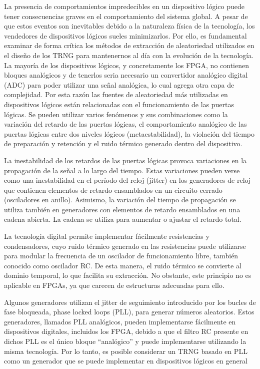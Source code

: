                 La presencia de comportamientos impredecibles en un dispositivo lógico puede tener consecuencias graves en el comportamiento del sistema global. A pesar de que estos eventos son inevitables debido a la naturaleza física de la tecnología, los vendedores de dispositivos lógicos sueles minimizarlos. Por ello, es fundamental examinar de forma crítica los métodos de extracción de aleatoriedad utilizados en el diseño de los TRNG para mantenernos al día con la evolución de la tecnología.
                La mayoría de los dispositivos lógicos, y concretamente los FPGA, no contienen bloques analógicos y de tenerlos seria necesario un convertidor analógico digital (ADC) para poder utilizar una señal analógica, lo cual agrega otra capa de complejidad. Por esta razón las fuentes de aleatoriedad más utilizadas en dispositivos lógicos están relacionadas con el funcionamiento de las puertas lógicas. Se pueden utilizar varios fenómenos y sus combinaciones como la variación del retardo de las puertas lógicas, el comportamiento analógico de las puertas lógicas entre dos niveles lógicos (metaestabilidad), la violación del tiempo de preparación y retención y el ruido térmico generado dentro del dispositivo.	
					
	            La inestabilidad de los retardos de las puertas lógicas provoca variaciones en la propagación de la señal a lo largo del tiempo. Estas variaciones pueden verse como una inestabilidad  en el período del reloj (jitter) en los generadores de reloj que contienen elementos de retardo ensamblados en un circuito cerrado (osciladores en anillo). Asimismo, la variación del tiempo de propagación se utiliza también en generadores con elementos de retardo ensamblados en una cadena abierta. La cadena se utiliza para aumentar o ajustar el retardo total.

                La tecnología digital permite implementar fácilmente resistencias y condensadores, cuyo ruido térmico generado en las resistencias puede utilizarse para modular la frecuencia de un oscilador de funcionamiento libre, también conocido como oscilador RC. De esta manera, el ruido térmico se convierte al dominio temporal, lo que facilita su extracción. No obstante, este principio no es aplicable en FPGAs, ya que carecen de estructuras adecuadas para ello.

                Algunos generadores utilizan el jitter de seguimiento introducido por los bucles de fase bloqueada, phase locked loops (PLL), para generar números aleatorios. Estos generadores, llamados PLL analógicos, pueden implementarse fácilmente en dispositivos digitales, incluidos los FPGA, debido a que el filtro RC presente en dichos PLL es el único bloque ``analógico'' y puede implementarse utilizando la misma tecnología. Por lo tanto, es posible considerar un TRNG basado en PLL como un generador que se puede implementar en dispositivos lógicos en general
					
